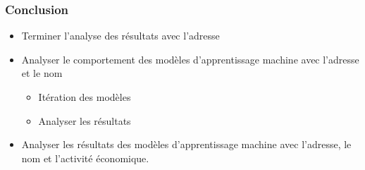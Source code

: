 \documentclass{beamer}
\begin{document}
	\begin{frame}[label=conclu]\frametitle{Conclusion}
		\begin{itemize}
			\item Terminer l'analyse des résultats avec l'adresse
			\item Analyser le comportement des modèles d'apprentissage machine avec l'adresse et le nom
			\begin{itemize}
				\item Itération des modèles
				\item Analyser les résultats
			\end{itemize}
			\item Analyser les résultats des modèles d'apprentissage machine avec l'adresse, le nom et l'activité économique.
		\end{itemize}
	\end{frame}
	
\end{document}
